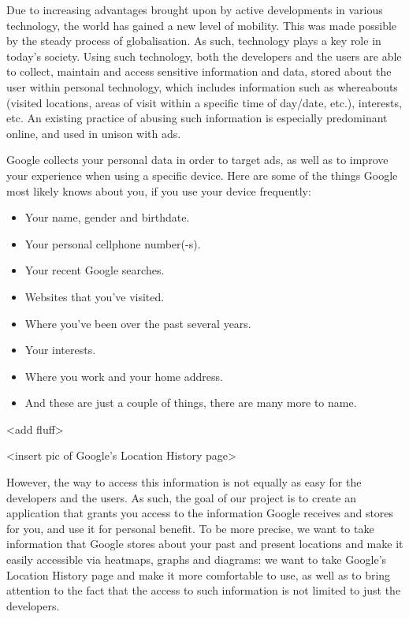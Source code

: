 \documentclass[12p]{article}
\begin{document}
		Due to increasing advantages brought upon by active developments in various technology, the world has gained a new level of mobility. This was made possible by the steady process of globalisation. As such, technology plays a key role in today's society. Using such technology, both the developers and the users are able to collect, maintain and access sensitive information and data, stored about the user within personal technology, which includes information such as whereabouts (visited locations, areas of visit within a specific time of day/date, etc.), interests, etc. An existing practice of abusing such information is especially predominant online, and used in unison with ads.
		
		Google collects your personal data in order to target ads, as well as to improve your experience when using a specific device. Here are some of the things Google most likely knows about you, if you use your device frequently:
		\begin{itemize}
			\item Your name, gender and birthdate.
			\item Your personal cellphone number(-s).
			\item Your recent Google searches.
			\item Websites that you've visited.
			\item Where you've been over the past several years.
			\item Your interests.
			\item Where you work and your home address.
			\item And these are just a couple of things, there are many more to name.
		\end{itemize}
		<add fluff>
		
		<insert pic of Google’s Location History page>
		
		However, the way to access this information is not equally as easy for the developers and the users. As such, the goal of our project is to create an application that grants you access to the information Google receives and stores for you, and use it for personal benefit. To be more precise, we want to take information that Google stores about your past and present locations and make it easily accessible via heatmaps, graphs and diagrams: we want to take Google's Location History page and make it more comfortable to use, as well as to bring attention to the fact that the access to such information is not limited to just the developers.
		
\end{document}
